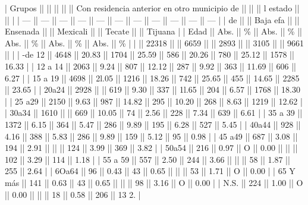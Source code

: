 \documentclass{article}
\begin{document}
| Grupos   ||       ||          ||      ||          || Con residencia anterior en otro municipio de ||          ||      || l estado ||      ||         |
| ---      || ---   || ---      || ---  || ---      || ---                                          || ---      || ---  || ---      || ---  || ---     |
| de       ||       || Baja efa ||      || Ensenada ||                                              || Mexicali ||      || Tecate   ||      || Tijuana |
| Edad     || Abs.  || \%        || Abs. || \%        || Abs.                                         || \%        || Abs. || \%        || Abs. || \%       |
|          || 22318 ||          || 6659 ||          || 2893                                         ||          || 3105 ||          || 9661 ||         |
| -de 12   || 4648  || 20.83    || 1704 || 25.59    || 586                                          || 20.26    || 780  || 25.12    || 1578 || 16.33   |
| 12 a 14  || 2063  || 9.24     || 807  || 12.12    || 287                                          || 9.92     || 363  || 11.69    || 606  || 6.27    |
| 15 a 19  || 4698  || 2l.05    || 1216 || 18.26    || 742                                          || 25.65    || 455  || 14.65    || 2285 || 23.65   |
| 20a24    || 2928  ||          || 619  || 9.30     || 337                                          || 1l.65    || 204  || 6.57     || 1768 || 18.30   |
| 25 a29   || 2150  || 9.63     || 987  || 14.82    || 295                                          || 10.20    || 268  || 8.63     || 1219 || 12.62   |
| 30a34    || 1610  ||          || 669  || 10.05    || 74                                           || 2.56     || 228  || 7.34     || 639  || 6.61    |
| 35 a 39  || 1372  || 6.15     || 364  || 5.47     || 286                                          || 9.89     || 195  || 6.28     || 527  || 5.45    |
| 40a44    || 928   || 4.16     || 388  || 5.83     || 286                                          || 9.89     || 159  || 5.12     || 95   || 0.98    |
| 45 a49   || 687   || 3.08     || 194  || 2.91     ||                                              ||          || 124  || 3.99     || 369  || 3.82    |
| 50a54    || 216   || 0.97     || O    || 0.00     ||                                              ||          || 102  || 3.29     || 114  || 1.18    |
| 55 a 59  || 557   || 2.50     || 244  || 3.66     ||                                              ||          || 58   || 1.87     || 255  || 2.64    |
| 6Oa64    || 96    || 0.43     || 43   || 0.65     ||                                              ||          || 53   || 1.71     || O    || 0.00    |
| 65 Y más || 141   || 0.63     || 43   || 0.65     ||                                              ||          || 98   || 3.16     || O    || 0.00    |
| N.S.     || 224   || 1.00     || O    || 0.00     ||                                              ||          || 18   || 0.58     || 206  || 13 2.   |
\end{document}
